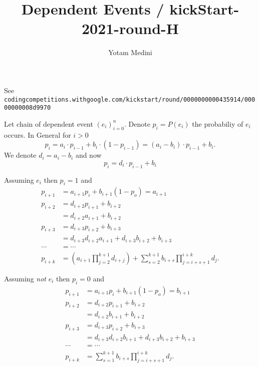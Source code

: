 \documentclass[10pt]{article}
\title{Dependent Events / kickStart-2021-round-H}
\author{Yotam Medini}
\begin{document}
\maketitle

See \texttt{codingcompetitions.withgoogle.com/kickstart/round/0000000000435914/00000000008d9970}

Let chain of dependent event \((e_i)_{i=0}^n\).
Denote \(p_i = P(e_i)\) the probabiliy of \(e_i\) occurs.
In General for \(i > 0\)
\begin{equation*}
p_i 
  = a_i\cdot p_{i-1} + b_i\cdot (1 - p_{i-1})
  = (a_i - b_i)\cdot p_{i-1} + b_i.
\end{equation*}
We denote \(d_i = a_i - b_i\) and now
\begin{equation*}
p_i = d_i\cdot p_{i-1} + b_i %
\end{equation*}

Assuming \(e_i\) then \(p_i = 1\) and
\begin{align*}
p_{i+1} &= a_{i+1} p_i + b_{i+1}(1 - p_o) = a_{i+1} \\
p_{i+2} &= d_{i+2}p_{i+1} + b_{i+2} \\
       &= d_{i+2}a_{i+1} + b_{i+2} \\
p_{i+3} &= d_{i+3}p_{i+2} + b_{i+3} \\
       &= d_{i+3}d_{i+2}a_{i+1} + d_{i+3}b_{i+2} + b_{i+3} \\
\cdots &= \cdots \\
p_{i+k} &= \left(a_{i+1}\prod_{j=2}^{k+1}d_{i+j}\right)
       +  \sum_{s=2}^{k+1} b_{i+s} \prod_{j=i+s+1}^{i+k} d_j .
\end{align*}


Assuming \emph{not} \(e_i\) then \(p_i = 0\) and
\begin{align*}
p_{i+1} &= a_{i+1} p_i + b_{i+1}(1 - p_o) = b_{i+1} \\
p_{i+2} &= d_{i+2}p_{i+1} + b_{i+2} \\
       &= d_{i+2}b_{i+1} + b_{i+2} \\
p_{i+3} &= d_{i+3}p_{i+2} + b_{i+3} \\
       &= d_{i+3}d_{i+2}b_{i+1} + d_{i+3}b_{i+2} + b_{i+3} \\
\cdots &= \cdots \\
p_{i+k} &= \sum_{s=1}^{k+1} b_{i+s} \prod_{j=i+s+1}^{i+k} d_j .
\end{align*}
\end{document}
